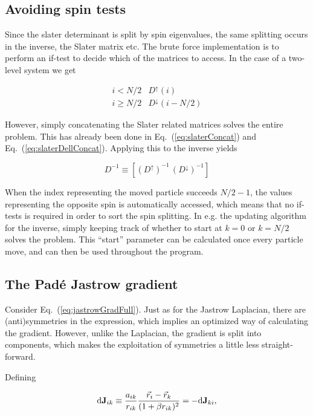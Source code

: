 \subsection{Avoiding spin tests}

Since the slater determinant is split by spin eigenvalues, the same splitting occurs in the inverse, the Slater matrix etc. The brute force implementation is to perform an if-test to decide which of the matrices to access. In the case of a two-level system we get

\begin{equation}
\begin{array}{cl}
 i < N/2 & D^\uparrow(i) \\
 i \ge N/2 & D^\downarrow(i - N/2)
\end{array} 
\end{equation}

However, simply concatenating the Slater related matrices solves the entire problem. This has already been done in Eq.~(\ref{eq:slaterConcat}) and Eq.~(\ref{eq:slaterDellConcat}). Applying this to the inverse yields

\begin{equation}
 D^{-1} \equiv \left[(D^\uparrow)^{-1}\,(D^\downarrow)^{-1}\right]
\end{equation}

When the index representing the moved particle succeeds $N/2-1$, the values representing the opposite spin is automatically accessed, which means that no if-tests is required in order to sort the spin splitting. In e.g. the updating algorithm for the inverse, simply keeping track of whether to start at $k=0$ or $k=N/2$ solves the problem. This ``start'' parameter can be calculated once every particle move, and can then be used throughout the program. 

\subsection{The Padé Jastrow gradient}
\label{sec:optJastGrad}

Consider Eq.~(\ref{eq:jastrowGradFull}). Just as for the Jastrow Laplacian, there are (anti)symmetries in the expression, which implies an optimized way of calculating the gradient. However, unlike the Laplacian, the gradient is split into components, which makes the exploitation of symmetries a little less straight-forward. 

Defining

\begin{equation}
 \mathrm{d}\mathbf{J}_{ik}  \equiv \frac{a_{ik}}{r_{ik}}\frac{\vec r_i - \vec r_k}{(1 + \beta r_{ik})^2} = -\mathrm{d}\mathbf{J}_{ki},
\end{equation}

